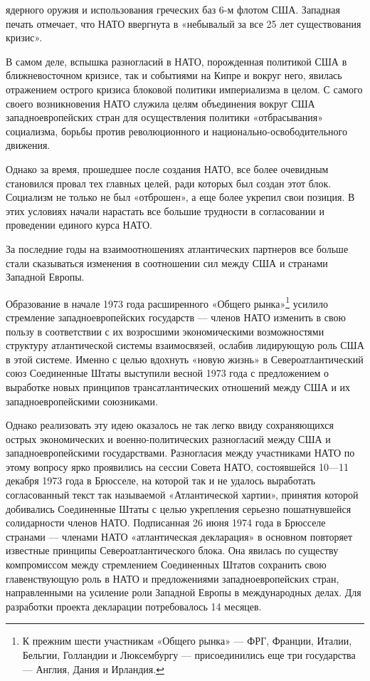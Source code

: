 \documentclass[12pt, a4paper, openany]{book}
\begin{document}
ядерного оружия и использования греческих баз 6-м флотом США. Западная печать отмечает, что НАТО ввергнута в «небывалый за все 25 лет существования кризис».
	
	В самом деле, вспышка разногласий в НАТО, порожденная политикой США в ближневосточном кризисе, так и событиями на Кипре и вокруг него, явилась отражением острого кризиса блоковой политики империализма в целом. С самого своего возникновения НАТО служила целям объединения вокруг США западноевропейских стран для осуществления политики «отбрасывания» социализма, борьбы против революционного и национально-освободительного движения.
	
	Однако за время, прошедшее после создания НАТО, все более очевидным становился провал тех главных целей, ради которых был создан этот блок. Социализм не только не был «отброшен», а еще более укрепил свои позиция. В этих условиях начали нарастать все большие трудности в согласовании и проведении единого курса НАТО.
	
	За последние годы на взаимоотношениях атлантических партнеров все больше стали сказываться изменения в соотношении сил между США и странами Западной Европы.
	
	Образование в начале 1973 года расширенного «Общего рынка»{\footnote{К прежним шести участникам «Общего рынка» — ФРГ, Франции, Италии, Бельгии, Голландии и Люксембургу — присоединились еще три государства — Англия, Дания и Ирландия.}} усилило стремление западноевропейских государств — членов НАТО изменить в свою пользу в соответствии с их возросшими экономическими возможностями структуру атлантической системы взаимосвязей, ослабив лидирующую роль США в этой системе. Именно с целью вдохнуть «новую жизнь» в Североатлантический союз Соединенные Штаты выступили весной 1973 года с предложением о выработке новых принципов трансатлантических отношений между США и их западноевропейскими союзниками.
	
	
	Однако реализовать эту идею оказалось не так легко ввиду сохраняющихся острых экономических и военно-политических разногласий между США и западноевропейскими государствами. Разногласия между участниками НАТО по этому вопросу ярко проявились на сессии Совета НАТО, состоявшейся 10—11 декабря 1973 года в Брюсселе, на которой так и не удалось выработать согласованный текст так называемой «Атлантической хартии», принятия которой добивались Соединенные Штаты с целью укрепления серьезно пошатнувшейся солидарности членов НАТО. Подписанная 26 июня 1974 года в Брюсселе странами — членами НАТО «атлантическая декларация» в основном повторяет известные принципы Североатлантического блока. Она явилась по существу компромиссом между стремлением Соединенных Штатов сохранить свою главенствующую роль в НАТО и предложениями западноевропейских стран, направленными на усиление роли Западной Европы в международных делах. Для разработки проекта декларации потребовалось 14 месяцев.
	
\end{document}
